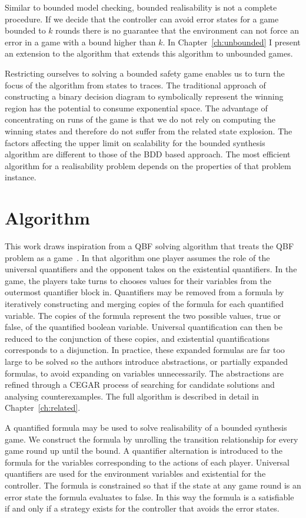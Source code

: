 Similar to bounded model checking, bounded realisability is not a complete procedure.  If we decide that the controller can avoid error states for a game bounded to $k$ rounds there is no guarantee that the environment can not force an error in a game with a bound higher than $k$. In Chapter~\ref{ch:unbounded} I present an extension to the algorithm that extends this algorithm to unbounded games.

Restricting ourselves to solving a bounded safety game enables us to turn the focus of the algorithm from states to traces. The traditional approach of constructing a binary decision diagram to symbolically represent the winning region has the potential to consume exponential space. The advantage of concentrating on runs of the game is that we do not rely on computing the winning states and therefore do not suffer from the related state explosion. The factors affecting the upper limit on scalability for the bounded synthesis algorithm are different to those of the BDD based approach. The most efficient algorithm for a realisability problem depends on the properties of that problem instance.

\section{Algorithm}

This work draws inspiration from a QBF solving algorithm that treats the QBF problem as a game~\cite{Janota12}. In that algorithm one player assumes the role of the universal quantifiers and the opponent takes on the existential quantifiers. In the game, the players take turns to chooses values for their variables from the outermost quantifier block in. Quantifiers may be removed from a formula by iteratively constructing and merging copies of the formula for each quantified variable. The copies of the formula represent the two possible values, true or false, of the quantified boolean variable. Universal quantification can then be reduced to the conjunction of these copies, and existential quantifications corresponds to a disjunction. In practice, these expanded formulas are far too large to be solved so the authors introduce abstractions, or partially expanded formulas, to avoid expanding on variables unnecessarily. The abstractions are refined through a CEGAR process of searching for candidate solutions and analysing counterexamples. The full algorithm is described in detail in Chapter~\ref{ch:related}. 

A quantified formula may be used to solve realisability of a bounded synthesis game. We construct the formula by unrolling the transition relationship for every game round up until the bound. A quantifier alternation is introduced to the formula for the variables corresponding to the actions of each player. Universal quantifiers are used for the environment variables and existential for the controller. The formula is constrained so that if the state at any game round is an error state the formula evaluates to false. In this way the formula is a satisfiable if and only if a strategy exists for the controller that avoids the error states.

